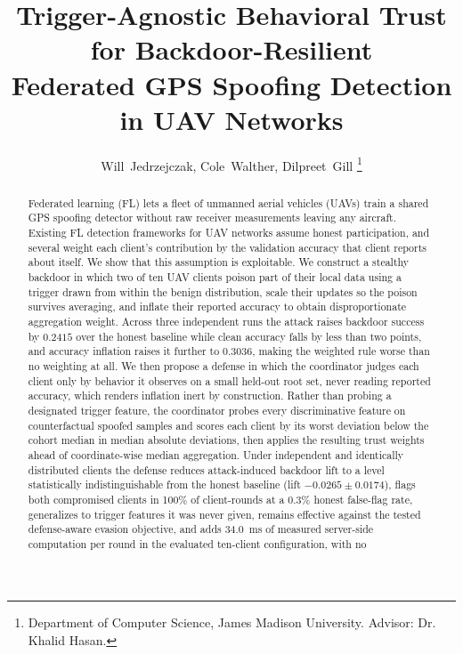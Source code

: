 \documentclass[journal]{IEEEtran}
\begin{document}
\title{Trigger-Agnostic Behavioral Trust for Backdoor-Resilient\\ Federated GPS Spoofing Detection in UAV Networks}

\author{
Will~Jedrzejczak,
Cole~Walther,
Dilpreet~Gill
\thanks{Department of Computer Science, James Madison University. Advisor: Dr. Khalid Hasan.}
}

\maketitle

\begin{abstract}
Federated learning (FL) lets a fleet of unmanned aerial vehicles (UAVs)
train a shared GPS spoofing detector without raw receiver measurements
leaving any aircraft. Existing FL detection frameworks for UAV networks
assume honest participation, and several weight each client's
contribution by the validation accuracy that client reports about
itself. We show that this assumption is exploitable. We construct a
stealthy backdoor in which two of ten UAV clients poison part of their
local data using a trigger drawn from within the benign distribution,
scale their updates so the poison survives averaging, and inflate their
reported accuracy to obtain disproportionate aggregation weight. Across
three independent runs the attack raises backdoor success by $0.2415$
over the honest baseline while clean accuracy falls by less than two
points, and accuracy inflation raises it further to $0.3036$, making the
weighted rule worse than no weighting at all. We then
propose a defense in which the coordinator judges each client only by
behavior it observes on a small held-out root set, never reading
reported accuracy, which renders inflation inert by construction. Rather
than probing a designated trigger feature, the coordinator probes every
discriminative feature on counterfactual spoofed samples and scores each
client by its worst deviation below the cohort median in median absolute
deviations, then applies the resulting trust weights ahead of
coordinate-wise median aggregation. Under independent and identically
distributed clients the defense reduces attack-induced backdoor lift to a
level statistically indistinguishable from the honest baseline (lift
$-0.0265 \pm 0.0174$), flags both compromised clients in 100\% of
client-rounds at a 0.3\% honest false-flag rate, generalizes to trigger
features it was never given, remains effective against the tested
defense-aware evasion objective, and adds 34.0~ms of measured server-side
computation per round in the evaluated ten-client configuration, with no

\end{abstract}
\end{document}
